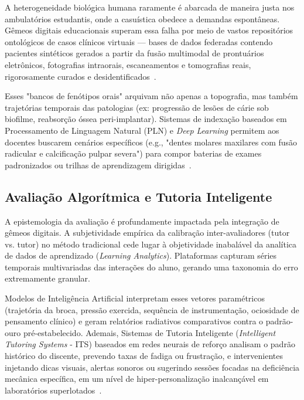 A heterogeneidade biológica humana raramente é abarcada de maneira justa nos ambulatórios estudantis, onde a casuística obedece a demandas espontâneas. Gêmeos digitais educacionais superam essa falha por meio de vastos repositórios ontológicos de casos clínicos virtuais — bases de dados federadas contendo pacientes sintéticos gerados a partir da fusão multimodal de prontuários eletrônicos, fotografias intraorais, escaneamentos e tomografias reais, rigorosamente curados e desidentificados~\cite{ijmi2026disability}.

Esses "bancos de fenótipos orais" arquivam não apenas a topografia, mas também trajetórias temporais das patologias (ex: progressão de lesões de cárie sob biofilme, reabsorção óssea peri-implantar). Sistemas de indexação baseados em Processamento de Linguagem Natural (PLN) e \textit{Deep Learning} permitem aos docentes buscarem cenários específicos (e.g., "dentes molares maxilares com fusão radicular e calcificação pulpar severa") para compor baterias de exames padronizados ou trilhas de aprendizagem dirigidas~\cite{li2025impacts}.

\subsection{Avaliação Algorítmica e Tutoria Inteligente}
\label{subsec:avaliacao}

A epistemologia da avaliação é profundamente impactada pela integração de gêmeos digitais. A subjetividade empírica da calibração inter-avaliadores (tutor vs. tutor) no método tradicional cede lugar à objetividade inabalável da analítica de dados de aprendizado (\textit{Learning Analytics}). Plataformas capturam séries temporais multivariadas das interações do aluno, gerando uma taxonomia do erro extremamente granular.

Modelos de Inteligência Artificial interpretam esses vetores paramétricos (trajetória da broca, pressão exercida, sequência de instrumentação, ociosidade de pensamento clínico) e geram relatórios radiativos comparativos contra o padrão-ouro pré-estabelecido. Ademais, Sistemas de Tutoria Inteligente (\textit{Intelligent Tutoring Systems} - ITS) baseados em redes neurais de reforço analisam o padrão histórico do discente, prevendo taxas de fadiga ou frustração, e intervenientes injetando dicas visuais, alertas sonoros ou sugerindo sessões focadas na deficiência mecânica específica, em um nível de hiper-personalização inalcançável em laboratórios superlotados~\cite{zhang2024recursive}.

